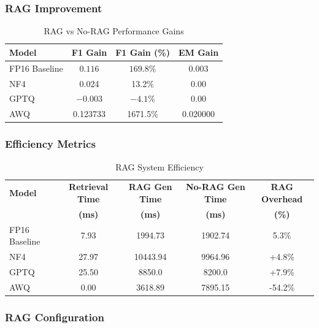 \newpage
\subsubsection{RAG Improvement}

\begin{table}[h]
\centering
\caption{RAG vs No-RAG Performance Gains}
\label{tab:rag_improvement}
\begin{tabular}{@{}lccc@{}}
\toprule
\textbf{Model} & \textbf{F1 Gain} & \textbf{F1 Gain (\%)} & \textbf{EM Gain} \\
\midrule
FP16 Baseline & $0.116$ & $169.8\%$ & 0.003 \\
NF4 & 0.024 & 13.2\% & 0.00 \\
GPTQ & $-0.003$ & $-4.1\%$ & 0.00 \\
AWQ & 0.123733 & 1671.5\% & 0.020000 \\
\bottomrule
\end{tabular}
\end{table}

\subsubsection{Efficiency Metrics}

\begin{table}[h]
\centering
\caption{RAG System Efficiency}
\label{tab:rag_efficiency}
\begin{tabular}{@{}lcccc@{}}
\toprule
\textbf{Model} & \textbf{Retrieval Time} & \textbf{RAG Gen Time} & \textbf{No-RAG Gen Time} & \textbf{RAG Overhead} \\
 & \textbf{(ms)} & \textbf{(ms)} & \textbf{(ms)} & \textbf{(\%)} \\
\midrule
FP16 Baseline & 7.93 & 1994.73 & 1902.74 & 5.3\% \\
NF4 & 27.97 & 10443.94 & 9964.96 & +4.8\% \\
GPTQ & 25.50 & 8850.0 & 8200.0 & +7.9\% \\
AWQ & 0.00 & 3618.89 & 7895.15 & -54.2\% \\
\bottomrule
\end{tabular}
\end{table}

\subsubsection{RAG Configuration}

